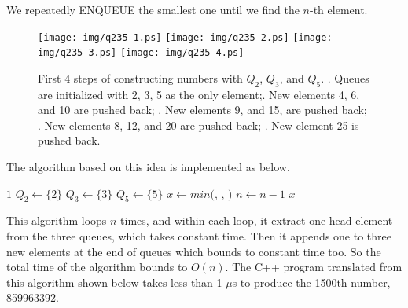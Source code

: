 \documentclass[b5paper]{article}
\begin{document}
We repeatedly ENQUEUE the smallest one until we find the $n$-th element.

\begin{figure}[htbp]
       \begin{center}
       	  \texttt{[image: img/q235-1.ps]}
       	  \texttt{[image: img/q235-2.ps]}
       	  \texttt{[image: img/q235-3.ps]}
       	  \texttt{[image: img/q235-4.ps]}
        \caption{First 4 steps of constructing numbers with $Q_2$, $Q_3$, and $Q_5$. . Queues are initialized with 2, 3, 5 as the only element;. New elements 4, 6, and 10 are pushed back; . New elements 9, and 15, are pushed back; . New elements 8, 12, and 20 are pushed back; . New element 25 is pushed back.} \label{fig:q235}
       \end{center}
\end{figure}

The algorithm based on this idea is implemented as below.

\begin{algorithmic}[1]
    \State \Return $1$
  \Else
    \State $Q_2 \gets \{ 2 \}$
    \State $Q_3 \gets \{ 3 \}$
    \State $Q_5 \gets \{ 5 \}$
      \State $x \gets min($, , $)$
        \State {}
        \State {}
        \State {}
        \State {}
        \State {}
        \State {}
        \State {}
      \Else
        \State {}
        \State {}
      \EndIf
      \State $n \gets n - 1$
    \EndWhile
    \State \Return $x$
  \EndIf
\EndFunction
\end{algorithmic}

This algorithm loops $n$ times, and within each loop, it extract one head
element from the three queues, which takes constant time. Then it appends
one to three new elements at the end of queues which bounds to constant time
too. So the total time of the algorithm bounds to $O(n)$. The C++ program
translated from this algorithm shown below takes less than 1 $\mu$s to
produce the 1500th number, 859963392.
\end{document}
